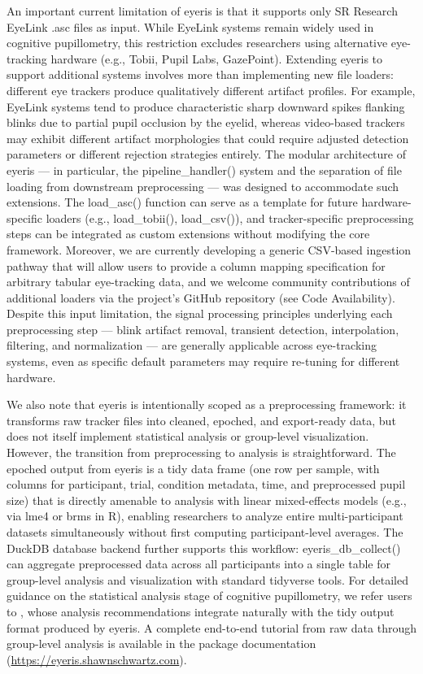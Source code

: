 An important current limitation of eyeris is that it supports only SR Research EyeLink .asc files as input. While EyeLink systems remain widely used in cognitive pupillometry, this restriction excludes researchers using alternative eye-tracking hardware (e.g., Tobii, Pupil Labs, GazePoint). Extending eyeris to support additional systems involves more than implementing new file loaders: different eye trackers produce qualitatively different artifact profiles. For example, EyeLink systems tend to produce characteristic sharp downward spikes flanking blinks due to partial pupil occlusion by the eyelid, whereas video-based trackers may exhibit different artifact morphologies that could require adjusted detection parameters or different rejection strategies entirely. The modular architecture of eyeris — in particular, the pipeline\_handler() system and the separation of file loading from downstream preprocessing — was designed to accommodate such extensions. The load\_asc() function can serve as a template for future hardware-specific loaders (e.g., load\_tobii(), load\_csv()), and tracker-specific preprocessing steps can be integrated as custom extensions without modifying the core framework. Moreover, we are currently developing a generic CSV-based ingestion pathway that will allow users to provide a column mapping specification for arbitrary tabular eye-tracking data, and we welcome community contributions of additional loaders via the project's GitHub repository (see Code Availability). Despite this input limitation, the signal processing principles underlying each preprocessing step — blink artifact removal, transient detection, interpolation, filtering, and normalization — are generally applicable across eye-tracking systems, even as specific default parameters may require re-tuning for different hardware.

We also note that eyeris is intentionally scoped as a preprocessing framework: it transforms raw tracker files into cleaned, epoched, and export-ready data, but does not itself implement statistical analysis or group-level visualization. However, the transition from preprocessing to analysis is straightforward. The epoched output from eyeris is a tidy data frame (one row per sample, with columns for participant, trial, condition metadata, time, and preprocessed pupil size) that is directly amenable to analysis with linear mixed-effects models (e.g., via lme4 or brms in R), enabling researchers to analyze entire multi-participant datasets simultaneously without first computing participant-level averages. The DuckDB database backend further supports this workflow: eyeris\_db\_collect() can aggregate preprocessed data across all participants into a single table for group-level analysis and visualization with standard tidyverse tools. For detailed guidance on the statistical analysis stage of cognitive pupillometry, we refer users to \textcite{mathot2023methods}, whose analysis recommendations integrate naturally with the tidy output format produced by eyeris. A complete end-to-end tutorial from raw data through group-level analysis is available in the package documentation (\url{https://eyeris.shawnschwartz.com}).

